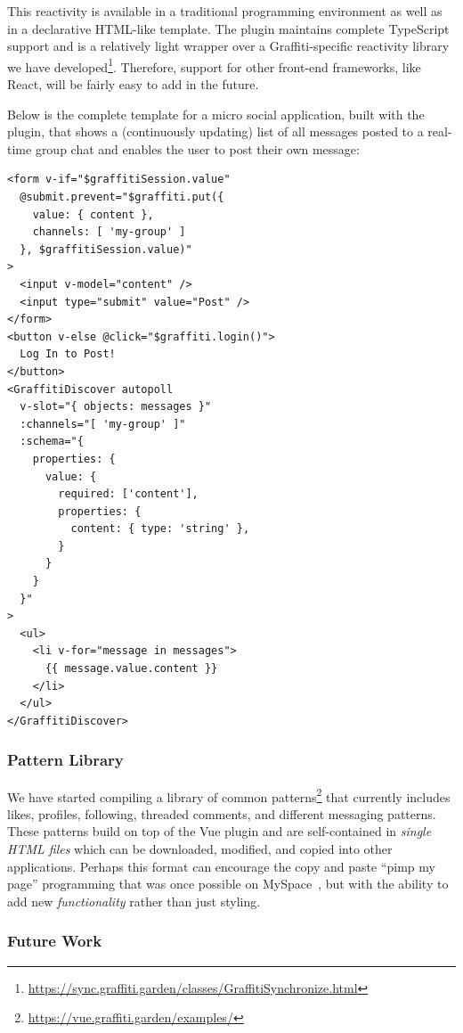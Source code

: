 This reactivity is available in a traditional programming
environment as well as in a declarative HTML-like template.
The plugin maintains complete TypeScript support and
is a relatively light wrapper over a Graffiti-specific reactivity library we have developed\footnote{
   \url{https://sync.graffiti.garden/classes/GraffitiSynchronize.html}
}.
Therefore, support for other front-end frameworks, like React, will be
fairly easy to add in the future.

Below is the complete template for a micro social application,
built with the plugin, that shows a (continuously updating) list of all messages posted to a real-time group chat and enables the user to post their own message:
\begin{verbatim}
<form v-if="$graffitiSession.value"
  @submit.prevent="$graffiti.put({
    value: { content },
    channels: [ 'my-group' ]
  }, $graffitiSession.value)"
>
  <input v-model="content" />
  <input type="submit" value="Post" />
</form>
<button v-else @click="$graffiti.login()">
  Log In to Post!
</button>
<GraffitiDiscover autopoll
  v-slot="{ objects: messages }"
  :channels="[ 'my-group' ]"
  :schema="{
    properties: {
      value: {
        required: ['content'],
        properties: {
          content: { type: 'string' },
        }
      }
    }
  }"
>
  <ul>
    <li v-for="message in messages">
      {{ message.value.content }}
    </li>
  </ul>
</GraffitiDiscover>
\end{verbatim}

\subsubsection{Pattern Library}

We have started compiling a library of common patterns\footnote{
    \url{https://vue.graffiti.garden/examples/}
} that currently includes likes, profiles, following, threaded comments,
and different messaging patterns.
These patterns build on top of the Vue plugin
and are self-contained in \emph{single HTML files}
which can be downloaded, modified, and copied into other
applications.
Perhaps this format can encourage the copy and paste ``pimp my page''
programming that was once possible on MySpace~\cite{copypasteliteracy},
but with the ability to add new \emph{functionality} rather than just styling.

\subsubsection{Future Work}
\label{above-and-below:above:future-work}

